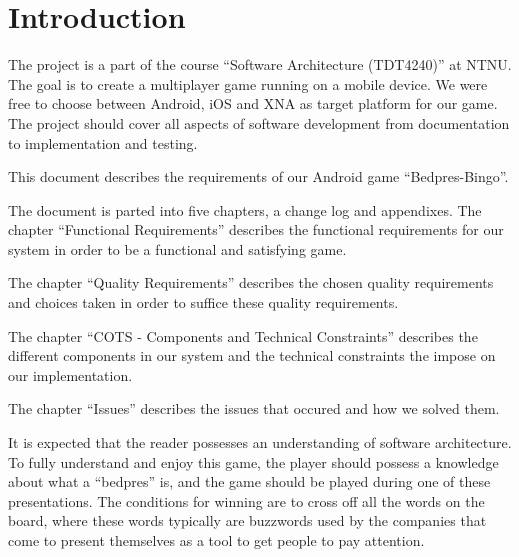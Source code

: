 \section{Introduction}
\label{sec:introduction}
The project is a part of the course ``Software Architecture (TDT4240)'' at NTNU. The goal is to create a multiplayer game running on a mobile device. We were free to choose between Android, iOS and XNA as target platform for our game. 
The project should cover all aspects of software development from documentation to implementation and testing. 

This document describes the requirements of our Android game ``Bedpres-Bingo''.

The document is parted into five chapters, a change log and appendixes. 
The chapter ``Functional Requirements'' describes the functional requirements for our system in order to be a functional and satisfying game.

The chapter ``Quality Requirements'' describes the chosen quality requirements and choices taken in order to suffice these quality requirements.

The chapter ``COTS - Components and Technical Constraints'' describes the different components in our system and the technical constraints the impose on our implementation.

The chapter ``Issues'' describes the issues that occured and how we solved them.

It is expected that the reader possesses an understanding of software
architecture. To fully understand and enjoy this game, the player should
possess a knowledge about what a ``bedpres'' is, and the game should be played
during one of these presentations. The conditions for winning are to cross off
all the words on the board, where these words typically are buzzwords used by
the companies that come to present themselves as a tool to get people to pay
attention.
